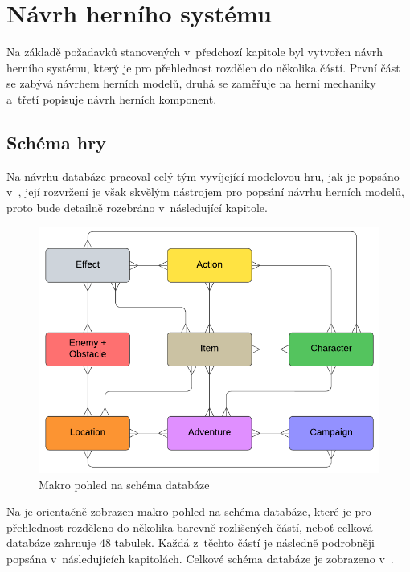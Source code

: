 \chapter{Návrh herního systému}
\label{chap:design}

Na základě požadavků stanovených v~předchozí kapitole  byl vytvořen návrh herního systému, který je pro přehlednost rozdělen do několika částí. První část se zabývá návrhem herních modelů, druhá se zaměřuje na herní mechaniky a~třetí popisuje návrh herních komponent.


\section{Schéma hry}
\label{sec:design_scheme}

Na návrhu databáze pracoval celý tým vyvíjející modelovou hru, jak je popsáno v~, její rozvržení je však skvělým nástrojem pro popsání návrhu herních modelů, proto bude detailně rozebráno v~následující kapitole.

\begin{figure}[h]
    \centering
    \includegraphics[scale=0.9]{../../shared/diagrams/er_macro.pdf}
    \caption{Makro pohled na schéma databáze}
    \label{diag:er_macro}
\end{figure}

Na  je orientačně zobrazen makro pohled na schéma databáze, které je pro přehlednost rozděleno do několika barevně rozlišených částí, neboť celková databáze zahrnuje 48 tabulek. Každá z~těchto částí je následně podrobněji popsána v~následujících kapitolách. Celkové schéma databáze je zobrazeno v~.


